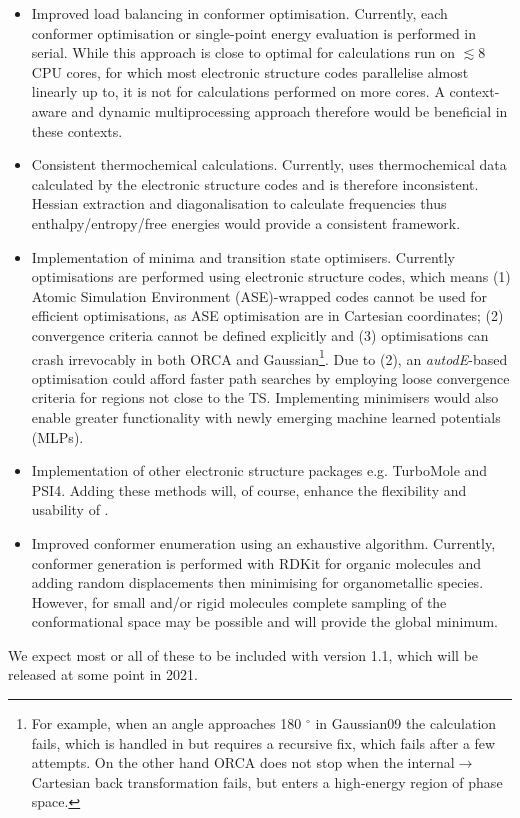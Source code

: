 \documentclass[../../main.tex]{subfiles}
\begin{document}
\begin{itemize}
	\item Improved load balancing in conformer optimisation. Currently, each conformer optimisation or single-point energy evaluation is performed in serial. While this approach is close to optimal for calculations run on $\lesssim 8$ CPU cores, for which most electronic structure codes parallelise almost linearly up to, it is not for \ade calculations performed on more cores. A context-aware and dynamic multiprocessing approach therefore would be beneficial in these contexts.
	
	\item Consistent thermochemical calculations. Currently, \ade uses thermochemical data calculated by the electronic structure codes and is therefore inconsistent. Hessian extraction and diagonalisation to calculate frequencies thus enthalpy/entropy/free energies would provide a consistent framework.
	
	\item Implementation of minima and transition state optimisers. Currently optimisations are performed using electronic structure codes, which means (1) Atomic Simulation Environment (ASE\cite{ASE2017})-wrapped codes cannot be used for efficient optimisations, as ASE optimisation are in Cartesian coordinates; (2) convergence criteria cannot be defined explicitly and (3) optimisations can crash irrevocably in both ORCA and Gaussian\footnote{For example, when an angle approaches 180 ${}^{\circ}$ in Gaussian09 the calculation fails, which is handled in \ade but requires a recursive fix, which fails after a few attempts. On the other hand ORCA does not stop when the internal$\rightarrow$Cartesian back transformation fails, but enters a high-energy region of phase space.}. Due to (2), an \emph{autodE}-based optimisation could afford faster path searches by employing loose convergence criteria for regions not close to the TS. Implementing minimisers would also enable greater functionality with newly emerging machine learned potentials (MLPs).
	
	\item Implementation of other electronic structure packages e.g. TurboMole and PSI4. Adding these methods will, of course, enhance the flexibility and usability of \ade.
	
	\item Improved conformer enumeration using an exhaustive algorithm. Currently, conformer generation is performed with RDKit for organic molecules and adding random displacements then minimising for organometallic species. However, for small and/or rigid molecules complete sampling of the conformational space may be possible and will provide the global minimum.
	
\end{itemize}

We expect most or all of these to be included with version 1.1, which will be released at some point in 2021.


\clearpage
\end{document}
